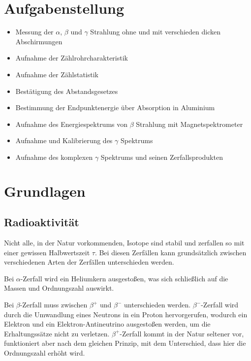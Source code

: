 \documentclass[12pt,english,ngerman]{scrartcl}
\begin{document}

\tableofcontents
\newpage

\section{Aufgabenstellung\label{Auf}}

\begin{itemize}
	\item Messung der \(\alpha\), \(\beta\) und \(\gamma\) Strahlung ohne und mit
	      verschieden dicken Abschirmungen
	\item Aufnahme der Zählrohrcharakteristik
	\item Aufnahme der Zählstatistik
	\item Bestätigung des Abstandsgesetzes
	\item Bestimmung der Endpunktenergie über Absorption in Aluminium
	\item Aufnahme des Energiespektrums von \(\beta\) Strahlung mit Magnetspektrometer
	\item Aufnahme und Kalibrierung des \(\gamma\) Spektrums
	\item Aufnahme des komplexen \(\gamma\) Spektrums und seinen Zerfallsprodukten
\end{itemize}

\section{Grundlagen}\label{Grund}

\subsection{Radioaktivität}
Nicht alle, in der Natur vorkommenden, Isotope sind stabil und zerfallen so mit
einer gewissen Halbwertszeit \(\tau\). Bei diesen Zerfällen kann grundsätzlich
zwischen verschiedenen Arten der Zerfällen unterschieden werden.

Bei \(\alpha\)-Zerfall wird ein Heliumkern ausgestoßen, was sich schließlich
auf die Massen und Ordnungszahl auswirkt.

Bei \(\beta\)-Zerfall muss zwischen \(\beta^+\) und \(\beta^-\) unterschieden
werden. \(\beta^-\)-Zerfall wird durch die Umwandlung eines Neutrons in ein
Proton hervorgerufen, wodurch ein Elektron und ein Elektron-Antineutrino
ausgestoßen werden, um die Erhaltungssätze nicht zu verletzen.
\(\beta^+\)-Zerfall kommt in der Natur seltener vor, funktioniert aber nach dem
gleichen Prinzip, mit dem Unterschied, dass hier die Ordnungszahl erhöht wird.
\end{document}
